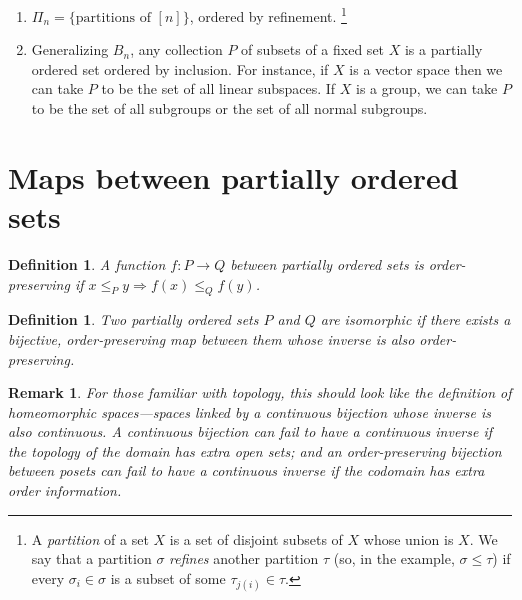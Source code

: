 \documentclass[11pt]{article}
\newtheorem{definition}[theorem]{Definition}
\newtheorem{remark}[theorem]{Remark}
\newcommand{\keyword}[1]{{\emph{#1}}}
\begin{document}
\begin{enumerate}
\begin{figure}[ht]
\begin{center}
    \end{center}
\end{figure}
\item
    $\Pi_n = \{\text{partitions of } [n]\}$, ordered by refinement.
    \footnote{
        A \keyword{partition} of a set $X$ is a set of disjoint subsets of $X$
        whose union is $X$. We say that a partition $\sigma$ \keyword{refines}
        another partition $\tau$ (so, in the example, $\sigma \leq \tau$) if
        every $\sigma_i \in \sigma$ is a subset of some $\tau_{j(i)} \in \tau$.
    }
\item
    Generalizing $B_n$, any collection $P$ of subsets of a fixed set $X$
    is a partially ordered set ordered by inclusion.
    For instance, if $X$ is a vector space then we can take $P$
    to be the set of all linear subspaces. If $X$ is a group, we can take $P$
    to be the set of all subgroups or the set of all normal subgroups.
\end{enumerate}

\section{Maps between partially ordered sets}

\begin{definition}
    A function $f: P \to Q$ between partially ordered sets is \keyword{order-preserving}
    if $x \leq_P y \Rightarrow f(x) \leq_Q f(y)$.
\end{definition}
\begin{definition}
    Two partially ordered sets $P$ and $Q$ are \keyword{isomorphic} if
    there exists a bijective, order-preserving map between them whose inverse
    is also order-preserving.
\end{definition}
\begin{remark}
    For those familiar with topology, this should look like the definition
    of homeomorphic spaces---spaces linked by a continuous bijection whose
    inverse is also continuous. A continuous bijection can fail to have a
    continuous inverse if the topology of the domain has extra open sets;
    and an order-preserving bijection between posets can fail to have
    a continuous inverse if the codomain has extra order information.
\end{remark}
\end{document}
